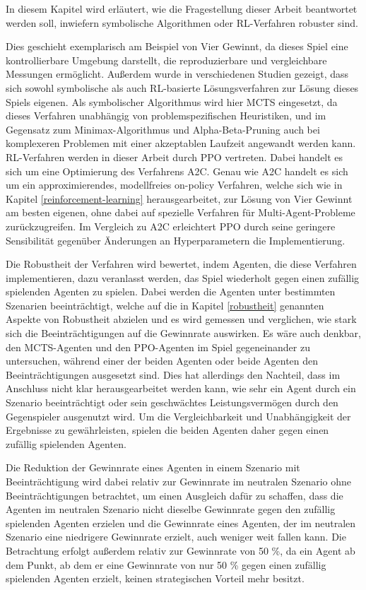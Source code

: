 \label{konzept}

In diesem Kapitel wird erläutert, wie die Fragestellung dieser Arbeit beantwortet werden soll, inwiefern symbolische Algorithmen oder RL-Verfahren robuster sind.

Dies geschieht exemplarisch am Beispiel von Vier Gewinnt, da dieses Spiel eine kontrollierbare Umgebung darstellt, die reproduzierbare und vergleichbare Messungen ermöglicht. Außerdem wurde in verschiedenen Studien gezeigt, dass sich sowohl symbolische als auch RL-basierte Lösungsverfahren zur Lösung dieses Spiels eigenen. Als symbolischer Algorithmus wird hier MCTS eingesetzt, da dieses Verfahren unabhängig von problemspezifischen Heuristiken, und im Gegensatz zum Minimax-Algorithmus und Alpha-Beta-Pruning auch bei komplexeren Problemen mit einer akzeptablen Laufzeit angewandt werden kann. RL-Verfahren werden in dieser Arbeit durch PPO vertreten. Dabei handelt es sich um eine Optimierung des Verfahrens A2C. Genau wie A2C handelt es sich um ein approximierendes, modellfreies on-policy Verfahren, welche sich wie in Kapitel \ref{reinforcement-learning} herausgearbeitet, zur Lösung von Vier Gewinnt am besten eigenen, ohne dabei auf spezielle Verfahren für Multi-Agent-Probleme zurückzugreifen. Im Vergleich zu A2C erleichtert PPO durch seine geringere Sensibilität gegenüber Änderungen an Hyperparametern die Implementierung.

Die Robustheit der Verfahren wird bewertet, indem Agenten, die diese Verfahren implementieren, dazu veranlasst werden, das Spiel wiederholt gegen einen zufällig spielenden Agenten zu spielen. Dabei werden die Agenten unter bestimmten Szenarien beeinträchtigt, welche auf die in Kapitel \ref{robustheit} genannten Aspekte von Robustheit abzielen und es wird gemessen und verglichen, wie stark sich die Beeinträchtigungen auf die Gewinnrate auswirken. Es wäre auch denkbar, den MCTS-Agenten und den PPO-Agenten im Spiel gegeneinander zu untersuchen, während einer der beiden Agenten oder beide Agenten den Beeinträchtigungen ausgesetzt sind. Dies hat allerdings den Nachteil, dass im Anschluss nicht klar herausgearbeitet werden kann, wie sehr ein Agent durch ein Szenario beeinträchtigt oder sein geschwächtes Leistungsvermögen durch den Gegenspieler ausgenutzt wird. Um die Vergleichbarkeit und Unabhängigkeit der Ergebnisse zu gewährleisten, spielen die beiden Agenten daher gegen einen zufällig spielenden Agenten.

Die Reduktion der Gewinnrate eines Agenten in einem Szenario mit Beeinträchtigung wird dabei relativ zur Gewinnrate im neutralen Szenario ohne Beeinträchtigungen betrachtet, um einen Ausgleich dafür zu schaffen, dass die Agenten im neutralen Szenario nicht dieselbe Gewinnrate gegen den zufällig spielenden Agenten erzielen und die Gewinnrate eines Agenten, der im neutralen Szenario eine niedrigere Gewinnrate erzielt, auch weniger weit fallen kann. Die Betrachtung erfolgt außerdem relativ zur Gewinnrate von 50 \%, da ein Agent ab dem Punkt, ab dem er eine Gewinnrate von nur 50 \% gegen einen zufällig spielenden Agenten erzielt, keinen strategischen Vorteil mehr besitzt.

